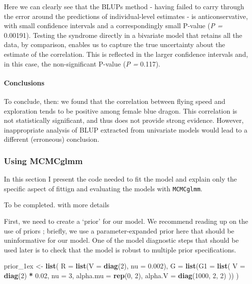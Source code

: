\documentclass[
  12pt,
]{book}
\newenvironment{Shaded}{\begin{snugshade}}{\end{snugshade}}
\newcommand{\DataTypeTok}[1]{\textcolor[rgb]{0.13,0.29,0.53}{#1}}
\newcommand{\DecValTok}[1]{\textcolor[rgb]{0.00,0.00,0.81}{#1}}
\newcommand{\FloatTok}[1]{\textcolor[rgb]{0.00,0.00,0.81}{#1}}
\newcommand{\KeywordTok}[1]{\textcolor[rgb]{0.13,0.29,0.53}{\textbf{#1}}}
\newcommand{\NormalTok}[1]{#1}
\newcommand{\OperatorTok}[1]{\textcolor[rgb]{0.81,0.36,0.00}{\textbf{#1}}}
\newcommand{\StringTok}[1]{\textcolor[rgb]{0.31,0.60,0.02}{#1}}
\begin{document}
Here we can clearly see that the BLUPs method - having failed to carry through the error around the predictions of individual-level estimates - is anticonservative, with small confidence intervals and a correspondingly small P-value (\emph{P =} 0.00191). Testing the syndrome directly in a bivariate model that retains all the data, by
comparison, enables us to capture the true uncertainty about the estimate of the correlation. This is reflected
in the larger confidence intervals and, in this case, the non-significant P-value (\emph{P =} 0.117).

\hypertarget{conclusions-1}{%
\paragraph{Conclusions}\label{conclusions-1}}

To conclude, then: we found that the correlation between flying speed and exploration tends to be positive among female blue dragon. This correlation is not statistically significant, and thus does not provide strong evidence. However, inappropriate analysis of BLUP extracted from univariate models would lead to a different (erroneous) conclusion.

\hypertarget{using-mcmcglmm}{%
\subsubsection{Using MCMCglmm}\label{using-mcmcglmm}}

In this section I present the code needed to fit the model and explain only the specific aspect of fittign and evaluating the models with \texttt{MCMCglmm}.

To be completed. with more details

First, we need to create a `prior' for our model. We recommend reading up on the use of priors \citep[see the course notes of \texttt{MCMCglmm}][]{R-MCMCglmm}; briefly, we use a parameter-expanded prior here that should be uninformative for our model. One of the model diagnostic steps that should be used later is to check that the model is robust to multiple prior specifications.

\begin{Shaded}
\begin{Highlighting}[]
\NormalTok{prior\_1ex \textless{}{-}}\StringTok{ }\KeywordTok{list}\NormalTok{(}
  \DataTypeTok{R =} \KeywordTok{list}\NormalTok{(}\DataTypeTok{V =} \KeywordTok{diag}\NormalTok{(}\DecValTok{2}\NormalTok{), }\DataTypeTok{nu =} \FloatTok{0.002}\NormalTok{),}
  \DataTypeTok{G =} \KeywordTok{list}\NormalTok{(}\DataTypeTok{G1 =} \KeywordTok{list}\NormalTok{(}
    \DataTypeTok{V =} \KeywordTok{diag}\NormalTok{(}\DecValTok{2}\NormalTok{) }\OperatorTok{*}\StringTok{ }\FloatTok{0.02}\NormalTok{, }\DataTypeTok{nu =} \DecValTok{3}\NormalTok{,}
    \DataTypeTok{alpha.mu =} \KeywordTok{rep}\NormalTok{(}\DecValTok{0}\NormalTok{, }\DecValTok{2}\NormalTok{),}
    \DataTypeTok{alpha.V =} \KeywordTok{diag}\NormalTok{(}\DecValTok{1000}\NormalTok{, }\DecValTok{2}\NormalTok{, }\DecValTok{2}\NormalTok{)}
\NormalTok{  ))}
\NormalTok{)}
\end{Highlighting}
\end{Shaded}
\end{document}
